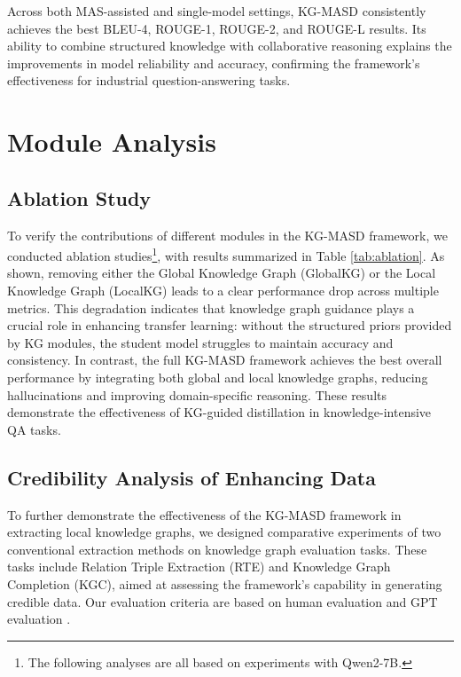 \documentclass[preprint,12pt]{elsarticle}
\begin{document}
Across both MAS-assisted and single-model settings, KG-MASD consistently achieves the best BLEU-4, ROUGE-1, ROUGE-2, and ROUGE-L results. 
Its ability to combine structured knowledge with collaborative reasoning explains the improvements in model reliability and accuracy, confirming the framework’s effectiveness for industrial question-answering tasks.




\section{Module Analysis}
\subsection{Ablation Study}



To verify the contributions of different modules in the KG-MASD framework, we conducted ablation studies\footnote{The following analyses are all based on experiments with Qwen2-7B.}, with results summarized in Table \ref{tab:ablation}. As shown, removing either the Global Knowledge Graph (GlobalKG) or the Local Knowledge Graph (LocalKG) leads to a clear performance drop across multiple metrics. This degradation indicates that knowledge graph guidance plays a crucial role in enhancing transfer learning: without the structured priors provided by KG modules, the student model struggles to maintain accuracy and consistency. In contrast, the full KG-MASD framework achieves the best overall performance by integrating both global and local knowledge graphs, reducing hallucinations and improving domain-specific reasoning. These results demonstrate the effectiveness of KG-guided distillation in knowledge-intensive QA tasks.


\subsection{Credibility Analysis of Enhancing Data}
\label{subsec:6.2}

To further demonstrate the effectiveness of the KG-MASD framework in extracting local knowledge graphs, we designed comparative experiments of two conventional extraction methods on knowledge graph evaluation tasks. These tasks include Relation Triple Extraction (RTE) and Knowledge Graph Completion (KGC), aimed at assessing the framework's capability in generating credible data. Our evaluation criteria are based on human evaluation and GPT evaluation \cite{Mese2025,Min2023}.
\end{document}
